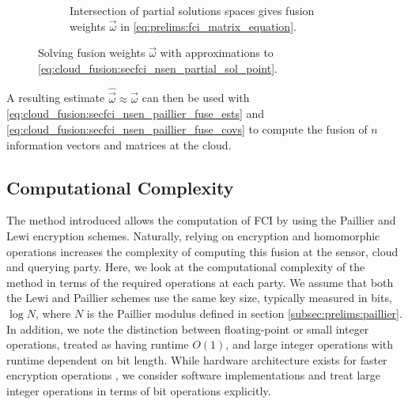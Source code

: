 \begin{figure}[htbp]
\begin{subfigure}[htbp]{\textwidth}
\begin{center}
        \end{center}
        \caption{Intersection of partial solutions spaces gives fusion weights $\vec{\omega}$ in \eqref{eq:prelims:fci_matrix_equation}.}
        \label{fig:cloud_fusion:secfci_partial_sol_intersection}
    \end{subfigure}
    \caption{Solving fusion weights $\vec{\omega}$ with approximations to \eqref{eq:cloud_fusion:secfci_nsen_partial_sol_point}.}
    \label{fig:cloud_fusion:secfci_nsen_partial_sols_and_intersect}
\end{figure}

A resulting estimate $\hat{\vec{\omega}} \approx \vec{\omega}$ can then be used with \eqref{eq:cloud_fusion:secfci_nsen_paillier_fuse_ests} and \eqref{eq:cloud_fusion:secfci_nsen_paillier_fuse_covs} to compute the fusion of $n$ information vectors and matrices at the cloud.

% 
% 

\subsection{Computational Complexity}\label{subsec:cloud_fusion:secfci_comp_complexity}
The method introduced allows the computation of FCI by using the Paillier and Lewi encryption schemes. Naturally, relying on encryption and homomorphic operations increases the complexity of computing this fusion at the sensor, cloud and querying party. Here, we look at the computational complexity of the method in terms of the required operations at each party. We assume that both the Lewi and Paillier schemes use the same key size, typically measured in bits, $\log{N}$, where $N$ is the Paillier modulus defined in section \ref{subsec:prelims:paillier}. In addition, we note the distinction between floating-point or small integer operations, treated as having runtime $O(1)$, and large integer operations with runtime dependent on bit length. While hardware architecture exists for faster encryption operations \cite{gueronIntelAdvancedEncryption2010}, we consider software implementations and treat large integer operations in terms of bit operations explicitly.


